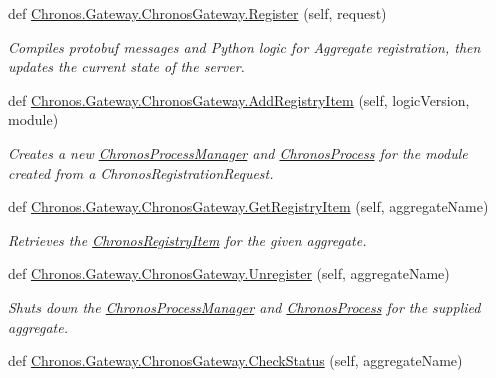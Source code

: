 \begin{DoxyCompactItemize}
\item 
def \hyperlink{group__Chronos_ga99107362643b72b54fdabf6d6d5ab0e9}{Chronos.\+Gateway.\+Chronos\+Gateway.\+Register} (self, request)
\begin{DoxyCompactList}\small\item\em Compiles protobuf messages and Python logic for Aggregate registration, then updates the current state of the server. \end{DoxyCompactList}\item 
def \hyperlink{group__Chronos_ga4e8e260962d11dc692f37a03da88e48a}{Chronos.\+Gateway.\+Chronos\+Gateway.\+Add\+Registry\+Item} (self, logic\+Version, module)
\begin{DoxyCompactList}\small\item\em Creates a new \hyperlink{classChronos_1_1Gateway_1_1ChronosProcessManager}{Chronos\+Process\+Manager} and \hyperlink{classChronos_1_1Gateway_1_1ChronosProcess}{Chronos\+Process} for the module created from a Chronos\+Registration\+Request. \end{DoxyCompactList}\item 
def \hyperlink{group__Chronos_ga62459e3c9eae9e1ea22841512298b40b}{Chronos.\+Gateway.\+Chronos\+Gateway.\+Get\+Registry\+Item} (self, aggregate\+Name)
\begin{DoxyCompactList}\small\item\em Retrieves the \hyperlink{classChronos_1_1Gateway_1_1ChronosRegistryItem}{Chronos\+Registry\+Item} for the given aggregate. \end{DoxyCompactList}\item 
def \hyperlink{group__Chronos_gaf1f7b9953b7fd0e2ef47e55405c66acc}{Chronos.\+Gateway.\+Chronos\+Gateway.\+Unregister} (self, aggregate\+Name)
\begin{DoxyCompactList}\small\item\em Shuts down the \hyperlink{classChronos_1_1Gateway_1_1ChronosProcessManager}{Chronos\+Process\+Manager} and \hyperlink{classChronos_1_1Gateway_1_1ChronosProcess}{Chronos\+Process} for the supplied aggregate. \end{DoxyCompactList}\item 
def \hyperlink{group__Chronos_ga9355f09e2f692b2d379033d69d5a02fa}{Chronos.\+Gateway.\+Chronos\+Gateway.\+Check\+Status} (self, aggregate\+Name)\hypertarget{group__Chronos_ga9355f09e2f692b2d379033d69d5a02fa}{}\label{group__Chronos_ga9355f09e2f692b2d379033d69d5a02fa}


\end{DoxyCompactItemize}
